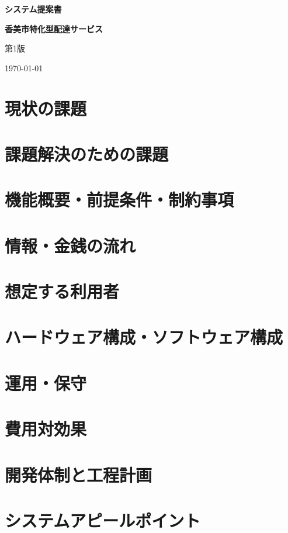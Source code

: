 \documentclass{jlreq}
\begin{document}
\begin{titlepage}
  \centering
  \vspace*{2cm}
  {\LARGE \bfseries システム提案書 \par}
  \vspace{1.5cm}
  {\Huge \bfseries 香美市特化型配達サービス \par}
  \vspace{3cm}
  {\Large 第1版 \par}
  \vspace{2cm}
  {\Large \today \par}
  \vspace{0.5cm}
  \vfill
\end{titlepage}

\newpage

\tableofcontents
\newpage


\section{現状の課題}


\section{課題解決のための課題}


\section{機能概要・前提条件・制約事項}


\section{情報・金銭の流れ}


\section{想定する利用者}


\section{ハードウェア構成・ソフトウェア構成}


\section{運用・保守}


\section{費用対効果}


\section{開発体制と工程計画}


\section{システムアピールポイント}

\end{document}
